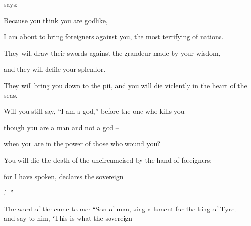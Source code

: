 {{}
says:
\par }{\Q Because
you think
you are godlike,
\par }{\Q {}I am
about to bring
foreigners
against
you, the most terrifying
of nations.
\par }{\Q They will draw
their swords
against
the grandeur
made by your wisdom,
\par }{\Q and they will defile
your splendor.
\par }{\Q {}They will bring
you down
to the pit,
and you will die
violently
in the heart
of the seas.
\par }{\Q {}Will you still say,
“I am
a god,”
before
the one who kills you –
\par }{\Q though you are a man and not a god –
\par }{\Q when you are in the power of those who wound you?
\par }{\Q {}You will die
the death
of the uncircumcised
by the hand
of foreigners;
\par }{\Q for
I
have spoken,
declares
the sovereign

{}.’ ”
\par }{\PP {}The word
of the {}
came to me:
“Son
of man,
sing
a lament
for the king
of Tyre,
and say
to him, ‘This is what
the sovereign

}
